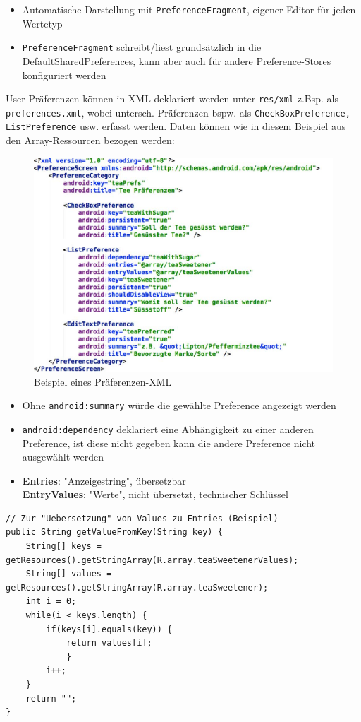\documentclass[a4paper]{article}
\begin{document}
	\begin{itemize}
		\item Automatische Darstellung mit \texttt{PreferenceFragment}, eigener Editor für jeden Wertetyp
		\item \texttt{PreferenceFragment} schreibt/liest grundsätzlich in die DefaultSharedPreferences, kann aber auch für andere Preference-Stores konfiguriert werden
	\end{itemize}

\newpage
\noindent
User-Präferenzen können in XML deklariert werden unter \texttt{res/xml} z.Bsp. als \texttt{preferences.xml}, wobei untersch. Präferenzen bspw. als \texttt{CheckBoxPreference, ListPreference} usw. erfasst werden. Daten können wie in diesem Beispiel aus den Array-Ressourcen bezogen werden:

\begin{figure}[htb!]
	\centering
	\includegraphics[width=.7\textwidth]{img/prefs_xml.jpg}
	\caption{Beispiel eines Präferenzen-XML}
\end{figure}

\begin{itemize}
	\item Ohne \texttt{android:summary} würde die gewählte Preference angezeigt werden
	\item \texttt{android:dependency} deklariert eine Abhängigkeit zu einer anderen Preference, ist diese nicht gegeben kann die andere Preference nicht ausgewählt werden
	\item \textbf{Entries}: "Anzeigestring", übersetzbar\\
	\textbf{EntryValues}: "Werte", nicht übersetzt, technischer Schlüssel
\end{itemize}
\begin{lstlisting}
// Zur "Uebersetzung" von Values zu Entries (Beispiel)
public String getValueFromKey(String key) {
	String[] keys = getResources().getStringArray(R.array.teaSweetenerValues);
	String[] values = getResources().getStringArray(R.array.teaSweetener);
	int i = 0;
	while(i < keys.length) {
		if(keys[i].equals(key)) {
			return values[i];
			}
		i++;
	}
	return "";
}
\end{lstlisting}
\end{document}
